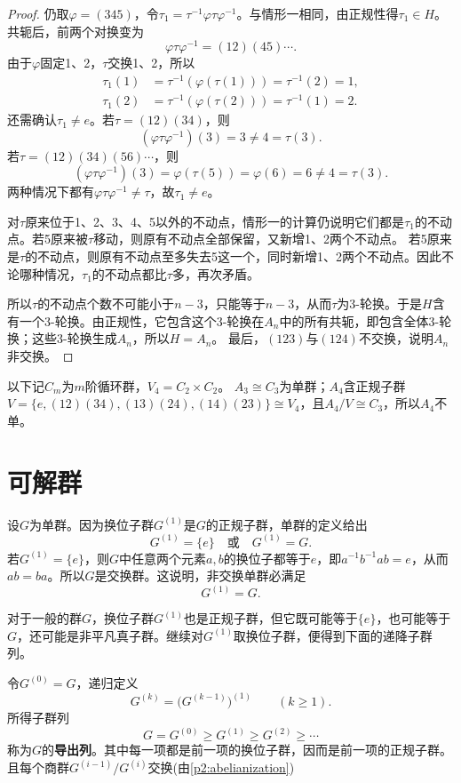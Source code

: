 \begin{proof}
仍取$\varphi=(345)$，令$\tau_1=\tau^{-1}\varphi\tau\varphi^{-1}$。与情形一相同，由正规性得$\tau_1\in H$。共轭后，前两个对换变为
\[
\varphi\tau\varphi^{-1}=(12)(45)\cdots.
\]
由于$\varphi$固定1、2，$\tau$交换1、2，所以
\begin{align*}
\tau_1(1)&=\tau^{-1}(\varphi(\tau(1)))=\tau^{-1}(2)=1,\\
\tau_1(2)&=\tau^{-1}(\varphi(\tau(2)))=\tau^{-1}(1)=2.
\end{align*}
还需确认$\tau_1\ne e$。若$\tau=(12)(34)$，则
\[
(\varphi\tau\varphi^{-1})(3)=3\ne4=\tau(3).
\]
若$\tau=(12)(34)(56)\cdots$，则
\[
(\varphi\tau\varphi^{-1})(3)=\varphi(\tau(5))=\varphi(6)=6
\ne4=\tau(3).
\]
两种情况下都有$\varphi\tau\varphi^{-1}\ne\tau$，故$\tau_1\ne e$。

对$\tau$原来位于1、2、3、4、5以外的不动点，情形一的计算仍说明它们都是$\tau_1$的不动点。若5原来被$\tau$移动，则原有不动点全部保留，又新增1、2两个不动点。
若5原来是$\tau$的不动点，则原有不动点至多失去5这一个，同时新增1、2两个不动点。因此不论哪种情况，$\tau_1$的不动点都比$\tau$多，再次矛盾。

所以$\tau$的不动点个数不可能小于$n-3$，只能等于$n-3$，从而$\tau$为3-轮换。于是$H$含有一个3-轮换。由正规性，它包含这个3-轮换在$A_n$中的所有共轭，即包含全体3-轮换；这些3-轮换生成$A_n$，所以$H=A_n$。
最后，$(123)$与$(124)$不交换，说明$A_n$非交换。
\end{proof}

\begin{example}
以下记$C_m$为$m$阶循环群，$V_4=C_2\times C_2$。
$A_3\cong C_3$为单群；$A_4$含正规子群
$V=\{e,(12)(34),(13)(24),(14)(23)\}\cong V_4$，且$A_4/V\cong C_3$，所以$A_4$不单。
\end{example}

\section{可解群}

设$G$为单群。因为换位子群$G^{(1)}$是$G$的正规子群，单群的定义给出
\[
G^{(1)}=\{e\}\quad\text{或}\quad G^{(1)}=G.
\]
若$G^{(1)}=\{e\}$，则$G$中任意两个元素$a,b$的换位子都等于$e$，即$a^{-1}b^{-1}ab=e$，从而$ab=ba$。所以$G$是交换群。这说明，非交换单群必满足
\[
G^{(1)}=G.
\]

对于一般的群$G$，换位子群$G^{(1)}$也是正规子群，但它既可能等于$\{e\}$，也可能等于$G$，还可能是非平凡真子群。继续对$G^{(1)}$取换位子群，便得到下面的递降子群列。

\begin{definition}
\label{p2:concept:c2-l504}令$G^{(0)}=G$，递归定义
\[
G^{(k)}=\bigl(G^{(k-1)}\bigr)^{(1)}\qquad(k\geq1).
\]
所得子群列
\[
G=G^{(0)}\geq G^{(1)}\geq G^{(2)}\geq\cdots
\]
称为$G$的\textbf{导出列}。其中每一项都是前一项的换位子群，因而是前一项的正规子群。且每个商群$G^{(i-1)}/G^{(i)}$交换(由\ref{p2:abelianization})
\end{definition}

